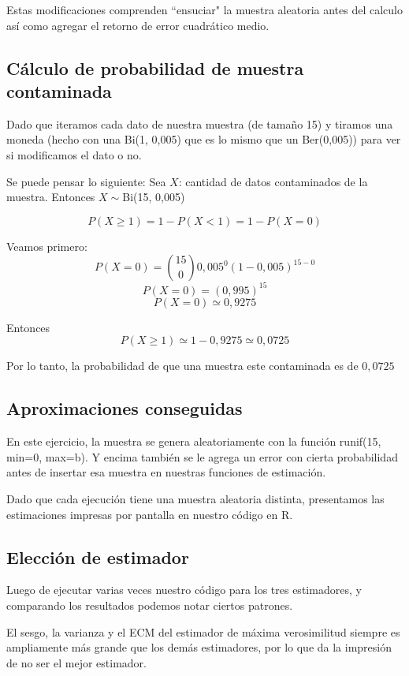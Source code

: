 \documentclass[a4paper]{article}
\begin{document}
Estas modificaciones comprenden ``ensuciar" la muestra aleatoria antes del calculo así como agregar el retorno de error cuadrático medio. 

\subsection{Cálculo de probabilidad de muestra contaminada}
Dado que iteramos cada dato de nuestra muestra (de tamaño 15) y tiramos una moneda (hecho con una Bi(1, 0,005) que es lo mismo que un Ber(0,005)) para ver si modificamos el dato o no. 

Se puede pensar lo siguiente: \newline \newline
Sea $X$: cantidad de datos contaminados de la muestra. \newline
Entonces $X\sim$Bi(15, 0,005)

\[
P(X \geq 1) = 1 - P(X < 1) = 1 - P(X = 0)
\]

Veamos primero: 
\[
P(X = 0) = {{15}\choose{0}} 0,005^{0} (1-0,005)^{15-0}
\]
\[
P(X = 0) = (0,995)^{15}
\]
\[
P(X = 0) \simeq 0,9275
\]

Entonces 
\[
P(X \geq 1) \simeq 1 - 0,9275 \simeq 0,0725
\]

Por lo tanto, la probabilidad de que una muestra este contaminada es de $0,0725$

\subsection{Aproximaciones conseguidas}
En este ejercicio, la muestra se genera aleatoriamente con la función runif(15, min=0, max=b). Y encima también se le agrega un error con cierta probabilidad antes de insertar esa muestra en nuestras funciones de estimación. 

Dado que cada ejecución tiene una muestra aleatoria distinta, presentamos las estimaciones impresas por pantalla en nuestro código en R.

\subsection{Elección de estimador}
Luego de ejecutar varias veces nuestro código para los tres estimadores, y comparando los resultados podemos notar ciertos patrones. 

El sesgo, la varianza y el ECM del estimador de máxima verosimilitud siempre es ampliamente más grande que los demás estimadores, por lo que da la impresión de no ser el mejor estimador. 
\end{document}
